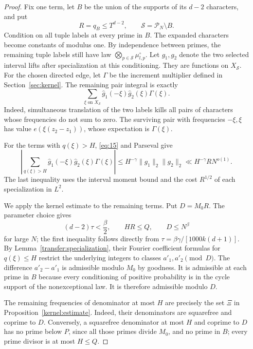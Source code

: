 \begin{proof}
Fix one term, let $B$ be the union of the supports of its $d-2$
characters, and put
\[
 R=q_B\le T^{d-2},\qquad
 \mathcal S=\mathcal P_N\setminus B.
\]
Condition on all tuple labels at every prime in $B$.
The expanded characters become constants of modulus one.
By independence between primes, the remaining tuple labels still have
law $\bigotimes_{p\in\mathcal S}\mu_{l,p}^{\circ}$.
Let $g_1,g_2$ denote the two selected interval lifts after specialization
at this conditioning.  They are functions on $X_{\mathcal S}$.
For the chosen directed edge, let $\Gamma$ be the increment multiplier
defined in Section~\ref{sec:kernel}.  The remaining pair integral is
exactly
\begin{equation}\label{eq:30}
 \sum_{\xi\text{ on }X_{\mathcal S}}
      \widehat g_1(-\xi)\widehat g_2(\xi)\Gamma(\xi).
\end{equation}
Indeed, simultaneous translation of the two labels kills all pairs of
characters whose frequencies do not sum to zero.  The surviving pair
with frequencies $-\xi,\xi$ has value
$e(\xi(z_2-z_1))$, whose expectation is $\Gamma(\xi)$.

For the terms with $q(\xi)>H$, \eqref{eq:15} and Parseval give
\[
 \left|\sum_{q(\xi)>H}
      \widehat g_1(-\xi)\widehat g_2(\xi)\Gamma(\xi)\right|
 \le H^{-\gamma}\|g_1\|_2\|g_2\|_2
 \ll H^{-\gamma}R N^{o(1)}.
\]
The last inequality uses the interval moment bound and the cost
$R^{1/2}$ of each specialization in $L^2$.

We apply the kernel estimate to the remaining terms.
Put $D=M_0R$.  The parameter choice gives
\[
 (d-2)\tau<\frac\beta2,
 \qquad HR\le Q,
 \qquad D\le N^\beta
\]
for large $N$; the first inequality follows directly from
$\tau=\beta\gamma/[1000k(d+1)]$.
By Lemma~\ref{transfer:specialization}, their Fourier coefficient
formulas for $q(\xi)\le H$ restrict the underlying integers to classes
$a'_1,a'_2\pmod D$.
The difference $a'_2-a'_1$ is admissible modulo $M_0$ by goodness.
It is admissible at each prime in $B$ because every conditioning of
positive probability is in the cycle support of the nonexceptional law.
It is therefore admissible modulo $D$.

The remaining frequencies of denominator at most $H$ are precisely the
set $\Xi$ in Proposition~\ref{kernel:estimate}.
Indeed, their denominators are squarefree and coprime to $D$.
Conversely, a squarefree denominator at most $H$ and coprime to $D$
has no prime below $P$, since all those primes divide $M_0$, and no
prime in $B$; every prime divisor is at most $H\le Q$.


\end{proof}
